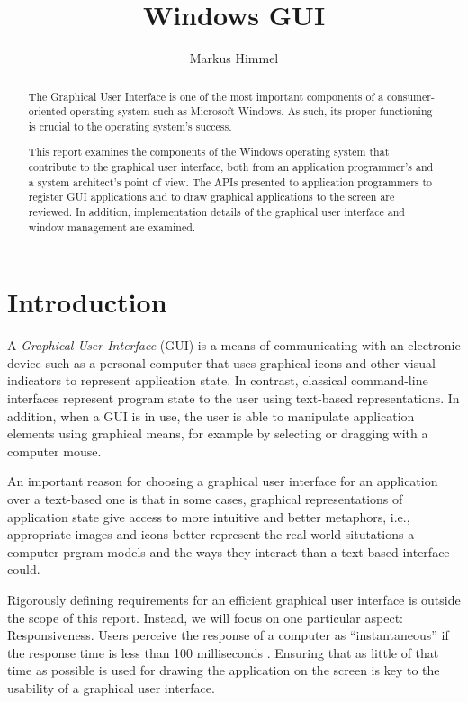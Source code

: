 \documentclass[10pt,twocolumn,a4paper]{article}
\author{Markus Himmel}
\title{Windows GUI}
\begin{document}
	\maketitle

	\begin{abstract}
		The Graphical User Interface is one of the most important components
		of a consumer-oriented operating system such as Microsoft Windows. As
		such, its proper functioning is crucial to the operating system's success.

		This report examines the components of the Windows operating system
		that contribute to the graphical user interface, both from an
		application programmer's and a system architect's point of view. The
		APIs presented to application programmers to register GUI applications
		and to draw graphical applications to the screen are reviewed. In addition,
		implementation details of the graphical user interface and window management
		are examined.
	\end{abstract}

	\section{Introduction}
		A \textit{Graphical User Interface} (GUI) is a means of communicating
		with an electronic device such as a personal computer that uses graphical
		icons and other visual indicators to represent application state. In
		contrast, classical command-line interfaces represent program state to
		the user using text-based representations. In addition, when a GUI is
		in use, the user is able to manipulate application elements using graphical
		means, for example by selecting or dragging with a computer mouse.

		An important reason for choosing a graphical user interface for an
		application over a text-based one is that in some cases, graphical
		representations of application state give access to more intuitive and
		better metaphors, i.e., appropriate images and icons better represent
		the real-world situtations a computer prgram models and the ways they
		interact than a text-based interface could.

		Rigorously defining requirements for an efficient graphical user
		interface is outside the scope of this report. Instead, we will focus
		on one particular aspect: Responsiveness. Users perceive the response
		of a computer as \enquote{instantaneous} if the response time is less
		than 100 milliseconds \cite{miller1968response}. Ensuring that as
		little of that time as possible is used for drawing the application on
		the screen is key to the usability of a graphical user interface.
\end{document}
